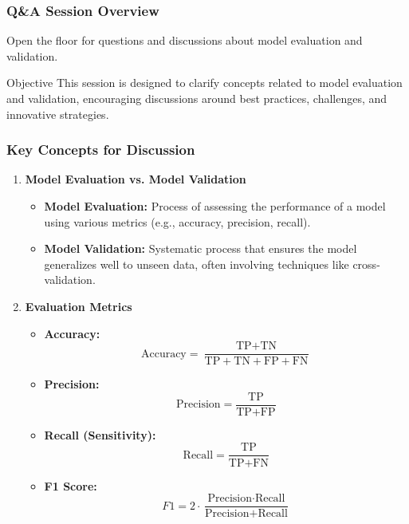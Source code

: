 \documentclass[aspectratio=169]{beamer}
\begin{document}
\begin{frame}[fragile]
    \frametitle{Q\&A Session Overview}
    Open the floor for questions and discussions about model evaluation and validation.
    \begin{block}{Objective}
        This session is designed to clarify concepts related to model evaluation and validation, encouraging discussions around best practices, challenges, and innovative strategies.
    \end{block}
\end{frame}

\begin{frame}[fragile]
    \frametitle{Key Concepts for Discussion}
    \begin{enumerate}
        \item \textbf{Model Evaluation vs. Model Validation}
        \begin{itemize}
            \item \textbf{Model Evaluation:} Process of assessing the performance of a model using various metrics (e.g., accuracy, precision, recall).
            \item \textbf{Model Validation:} Systematic process that ensures the model generalizes well to unseen data, often involving techniques like cross-validation.
        \end{itemize}
        
        \item \textbf{Evaluation Metrics}
        \begin{itemize}
            \item \textbf{Accuracy:} 
            \[ 
            \text{Accuracy} = \frac{\text{TP} + \text{TN}}{\text{TP} + \text{TN} + \text{FP} + \text{FN}} 
            \]
            \item \textbf{Precision:} 
            \[ 
            \text{Precision} = \frac{\text{TP}}{\text{TP} + \text{FP}} 
            \]
            \item \textbf{Recall (Sensitivity):} 
            \[ 
            \text{Recall} = \frac{\text{TP}}{\text{TP} + \text{FN}} 
            \]
            \item \textbf{F1 Score:} 
            \[ 
            F1 = 2 \cdot \frac{\text{Precision} \cdot \text{Recall}}{\text{Precision} + \text{Recall}} 
            \]
        \end{itemize}
    \end{enumerate}
\end{frame}
\end{document}
